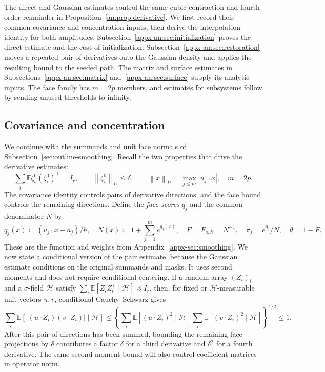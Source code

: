 \documentclass[11pt,letterpaper]{article}
\theoremstyle{remark}
\newcommand{\E}{\mathbb E}
\newcommand{\norm}[1]{\left\lVert#1\right\rVert}
\begin{document}
The direct and Gaussian estimates control the same cubic contraction
and fourth-order remainder in Proposition~\ref{an:prop:derivative}.
We first record their common covariance and concentration inputs,
then derive the interpolation identity for both amplitudes.
Subsection~\ref{appx-an:sec:initialization} proves the
direct estimate and the cost of initialization. Subsection~\ref{appx-an:sec:restoration}
moves a repeated pair of derivatives onto the Gaussian density and
applies the resulting bound to the seeded path.
The matrix and surface estimates in Subsections~\ref{appx-an:sec:matrix}
and~\ref{appx-an:sec:surface} supply its analytic inputs. The face
family has \(m=2p\) members, and estimates for subsystems follow by
sending unused thresholds to infinity.

\subsection{Covariance and concentration}
\label{appx-an:sec:coords}

We continue with the summands and unit face normals of
Subsection~\ref{sec:outline-smoothing}. Recall the two properties
that drive the derivative estimates:
\begin{equation}
 \sum_i\E\zeta_i^0(\zeta_i^0)^\top=I_r,
 \qquad \norm{\zeta_i^0}_U\le\delta,
 \qquad \norm x_U=\max_{j\le m}|u_j\cdot x|,
 \quad m=2p.
 \label{appx-eq:projected-bound}
\end{equation}
The covariance identity controls pairs of derivative directions,
and the face bound controls the remaining directions. Define the
\emph{face scores} \(q_j\) and the common denominator \(N\) by
\begin{equation}
 \label{appx-an:basic-notation}
 q_j(x)\coloneqq(u_j\cdot x-a_j)/h,\quad
 N(x)\coloneqq1+\sum_{j=1}^m e^{q_j(x)},\quad
 F=F_{a,h}=N^{-1},\quad\pi_j=e^{q_j}/N,\quad\theta=1-F.
\end{equation}
These are the function and weights from Appendix~\ref{appx-sec:smoothing}.
We now state a conditional version of the pair estimate, because
the Gaussian estimate conditions on the original summands and masks.
It uses second moments and does not require conditional centering. If a random array \((Z_i)_i\)
and a \(\sigma\)-field \(\mathcal H\) satisfy
\(\sum_i\E[Z_iZ_i^\top\mid\mathcal H]\preceq I_r\), then, for
fixed or \(\mathcal H\)-measurable unit vectors \(u,v\),
conditional Cauchy--Schwarz gives
\begin{equation}
 \sum_i\E[|(u\cdot Z_i)(v\cdot Z_i)|\mid\mathcal H]
 \le\left\{\sum_i\E[(u\cdot Z_i)^2\mid\mathcal H]
           \sum_i\E[(v\cdot Z_i)^2\mid\mathcal H]\right\}^{1/2}
 \le1.
 \label{appx-an:pair-contraction}
\end{equation}
After this pair of directions has been summed, bounding the remaining
face projections by \(\delta\) contributes a factor \(\delta\)
for a third derivative and \(\delta^2\) for a fourth derivative.
The same second-moment bound will also control coefficient matrices
in operator norm.
\end{document}
